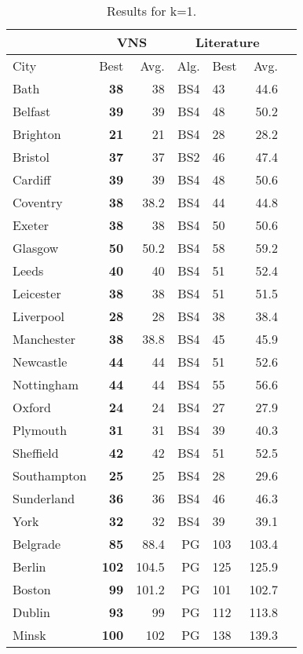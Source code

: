 \documentclass[dvipsnames,format=sigconf,anonymous=true,review=true]{acmart}
\begin{document}
 
  \begin{table}
  	\caption{Results for k=1.}
  	\label{tab:k1}  
 	\begin{tabular}{l|rr|rlrr}
 	\hline
 	\multicolumn{1}{c}{ } & \multicolumn{2}{|c}{VNS} & \multicolumn{3}{|c}{Literature} \\
 	\hline
	City & Best & Avg. & Alg. & Best & Avg. \\ \hline
	Bath&\bf{38}&38&BS4&43&44.6\\
	Belfast&\bf{39}&39&BS4&48&50.2\\
	Brighton&\bf{21}&21&BS4&28&28.2\\
	Bristol&\bf{37}&37&BS2&46&47.4\\
	Cardiff&\bf{39}&39&BS4&48&50.6\\
	Coventry&\bf{38}&38.2&BS4&44&44.8\\
	Exeter&\bf{38}&38&BS4&50&50.6\\
	Glasgow&\bf{50}&50.2&BS4&58&59.2\\
	Leeds&\bf{40}&40&BS4&51&52.4\\
	Leicester&\bf{38}&38&BS4&51&51.5\\
	Liverpool&\bf{28}&28&BS4&38&38.4\\
	Manchester&\bf{38}&38.8&BS4&45&45.9\\
	Newcastle&\bf{44}&44&BS4&51&52.6\\
	Nottingham&\bf{44}&44&BS4&55&56.6\\
	Oxford&\bf{24}&24&BS4&27&27.9\\
	Plymouth&\bf{31}&31&BS4&39&40.3\\
	Sheffield&\bf{42}&42&BS4&51&52.5\\
	Southampton&\bf{25}&25&BS4&28&29.6\\
	Sunderland&\bf{36}&36&BS4&46&46.3\\
	York&\bf{32}&32&BS4&39&39.1\\  \hline  \hline
	Belgrade&\bf{85}&88.4&PG&103&103.4\\
	Berlin&\bf{102}&104.5&PG&125&125.9\\
	Boston&\bf{99}&101.2&PG&101&102.7\\
	Dublin&\bf{93}&99&PG&112&113.8\\
	Minsk&\bf{100}&102&PG&138&139.3\\
	\hline
	
 	\end{tabular}
 \end{table}
\end{document}
